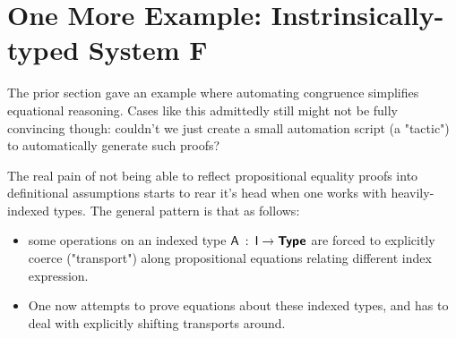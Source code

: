 \documentclass[
    a4paper, %
    fontsize=9.5pt, %
    twoside=false, %
	numbers=noenddot, %
	fontmethod=tex, %
]{kaobook}
\newcommand{\Conid}[1]{\mathit{#1}}
\newcommand{\Varid}[1]{\mathit{#1}}
\renewcommand\Varid[1]{\mathord{\textsf{#1}}}
\let\Conid\Varid
\newcommand\Keyword[1]{\textsf{\textbf{#1}}}
\begin{document}




\section{One More Example: Instrinsically-typed System F}

The prior section gave an example where automating congruence simplifies
equational reasoning. Cases like this admittedly still might not be fully
convincing though: couldn't we just create a small automation script (a 
"tactic") to automatically generate such proofs?

The real pain of not being able to reflect propositional equality proofs into
definitional assumptions starts to rear it's head when one works with
heavily-indexed types. The general pattern is that as follows:
\begin{itemize}
  \item some operations on an indexed
  type \ensuremath{\Conid{A}\;\mathbin{:}\;\Conid{I}\;\Varid{→}\;\Keyword{Type}} are forced to explicitly coerce ("transport") along
  propositional equations relating different index expression.
  \item One now attempts to prove equations about these indexed types, and has
  to deal with explicitly shifting transports around.
\end{itemize}
\end{document}
